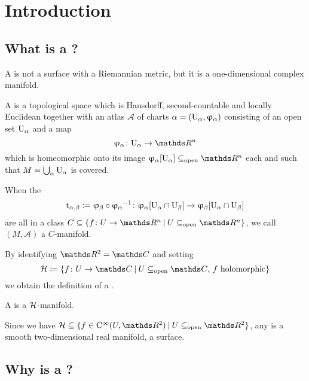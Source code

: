 \chapter{Introduction}

\section{What is a \RS?}

A \RS is not a surface with a Riemannian metric,
but it is a one-dimensional complex manifold.

\begin{defi}
	A  is a topological space
	which is Hausdorff, second-countable and locally Euclidean
	together with an atlas \(\mathcal A\)
	of charts \(\alpha = (\textup{U}_{\alpha}, \upvarphi_{\alpha})\)
	consisting of an open set \(\textup{U}_{\alpha}\)
	and a map
	\[\uphi\alpha\colon \U\alpha \to \R^n\]
	which is homeomorphic
	onto its image \(\uphi\alpha[\U\alpha] \subsetopen \R^n\)
	each
	and such that \(M = \bigcup_\alpha \textup{U}_{\alpha}\) is covered.

	When the 
	\begin{align*}
		\textup{t}_{\alpha, \beta}
		\coloneqq \upvarphi_{\beta}\circ{\upvarphi_{\alpha}}^{-1}
		\colon
		    \upvarphi_{\alpha}[\textup{U}_{\alpha}\cap\textup{U}_{\beta}]
	        \to \upvarphi_{\beta} [\textup{U}_{\alpha}\cap\textup{U}_{\beta}]
	\end{align*}
	are all in a class
	\(C \subseteq \{f\colon U \to \R^n \:\vert\: U \subsetopen \R^n\}\),
	we call \((M, \mathcal A)\) a \(C\)-manifold.
\end{defi}


By identifying \(\R^2 = \C\)
and setting
\[	\Hol \coloneqq
	\{f\colon U \to \C \:\vert\:
		\text{\(U \subsetopen \C\),
		\(f\) holomorphic}
	\}
\]
we obtain the definition of a \RS.

\begin{defi}
	A  is a \(\mathcal{H}\)-manifold.
\end{defi}

Since we have
\(\Hol \subset \{f \in \smooth(U, \R^2) \:\vert\: U \subsetopen \R^2\}\),
any \RS is a smooth two-dimensional real manifold,
\ie a surface.

\section{Why is a \RS?}

